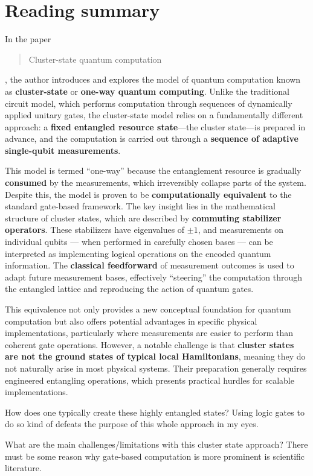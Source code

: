 \documentclass{alex_summary}
\begin{document}
\section*{Reading summary}

In the paper \blockcquote{nielsen_cluster-state_2006}{Cluster-state quantum computation}, the author introduces and explores the model of quantum computation known as \textbf{cluster-state} or \textbf{one-way quantum computing}. Unlike the traditional circuit model, which performs computation through sequences of dynamically applied unitary gates, the cluster-state model relies on a fundamentally different approach: a \textbf{fixed entangled resource state}—the cluster state—is prepared in advance, and the computation is carried out through a \textbf{sequence of adaptive single-qubit measurements}.

This model is termed “one-way” because the entanglement resource is gradually \textbf{consumed} by the measurements, which irreversibly collapse parts of the system. Despite this, the model is proven to be \textbf{computationally equivalent} to the standard gate-based framework. The key insight lies in the mathematical structure of cluster states, which are described by \textbf{commuting stabilizer operators}. These stabilizers have eigenvalues of \( \pm 1 \), and measurements on individual qubits — when performed in carefully chosen bases — can be interpreted as implementing logical operations on the encoded quantum information. The \textbf{classical feedforward} of measurement outcomes is used to adapt future measurement bases, effectively “steering” the computation through the entangled lattice and reproducing the action of quantum gates.

This equivalence not only provides a new conceptual foundation for quantum computation but also offers potential advantages in specific physical implementations, particularly where measurements are easier to perform than coherent gate operations. However, a notable challenge is that \textbf{cluster states are not the ground states of typical local Hamiltonians}, meaning they do not naturally arise in most physical systems. Their preparation generally requires engineered entangling operations, which presents practical hurdles for scalable implementations.

\begin{question1}
	How does one typically create these highly entangled states? Using logic gates to do so kind of defeats the purpose of this whole approach in my eyes.
\end{question1}

\begin{question3}
	What are the main challenges/limitations with this cluster state approach? There must be some reason why gate-based computation is more prominent is scientific literature.
\end{question3}

\printbibliography
\end{document}
